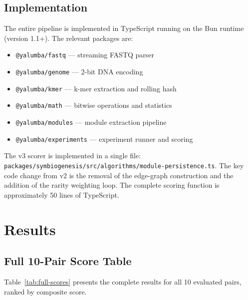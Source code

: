 \documentclass{../yalumba}
\begin{document}
\subsection{Implementation}

The entire pipeline is implemented in TypeScript running on the Bun runtime
(version 1.1+).  The relevant packages are:

\begin{itemize}
  \item \texttt{@yalumba/fastq} --- streaming FASTQ parser
  \item \texttt{@yalumba/genome} --- 2-bit DNA encoding
  \item \texttt{@yalumba/kmer} --- k-mer extraction and rolling hash
  \item \texttt{@yalumba/math} --- bitwise operations and statistics
  \item \texttt{@yalumba/modules} --- module extraction pipeline
  \item \texttt{@yalumba/experiments} --- experiment runner and scoring
\end{itemize}

The v3 scorer is implemented in a single file:
\texttt{packages/symbiogenesis/src/algorithms/module-persistence.ts}.  The
key code change from v2 is the removal of the edge-graph construction and
the addition of the rarity weighting loop.  The complete scoring function
is approximately 50 lines of TypeScript.


\section{Results}
\label{sec:results}

\subsection{Full 10-Pair Score Table}

Table~\ref{tab:full-scores} presents the complete results for all 10
evaluated pairs, ranked by composite score.
\end{document}
